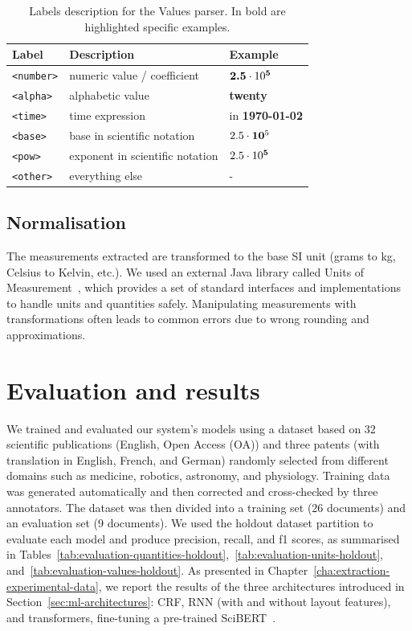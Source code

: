\begin{table}[htbp]
\centering
  \caption{Labels description for the Values parser. In bold are highlighted specific examples.}
  \label{tab:values-model-labels}
  \begin{tabular}{lll}
    \toprule
    Label & Description & Example\\
    \midrule
    \texttt{<number>} & numeric value / coefficient & $\textbf{2.5}\cdot10\textsuperscript{\textbf{5}}$ \\
    \texttt{<alpha>} & alphabetic value & \textbf{twenty} \\
    \texttt{<time>} & time expression  & in \textbf{1970-01-02}\\
    \texttt{<base>} & base in scientific notation & $2.5\cdot\textbf{10}\textsuperscript{5}$\\
    \texttt{<pow>} & exponent in scientific notation & $2.5\cdot10\textsuperscript{\textbf{5}}$ \\
    \texttt{<other>} & everything else & - \\
  \bottomrule
\end{tabular}
\end{table}

\subsection{Normalisation}

The measurements extracted are transformed to the base SI unit (grams to kg, Celsius to Kelvin, etc.). We used an external Java library called Units of Measurement~\cite{units_of_measurement}, which provides a set of standard interfaces and implementations to handle units and quantities safely. Manipulating measurements with transformations often leads to common errors due to wrong rounding and approximations. 

\section{Evaluation and results}
\label{sec:results}

We trained and evaluated our system's models using a dataset based on 32 scientific publications (English, Open Access (OA)) and three patents (with translation in English, French, and German) randomly selected from different domains such as medicine, robotics, astronomy, and physiology. 
Training data was generated automatically and then corrected and cross-checked by three annotators. The dataset was then divided into a training set (26 documents) and an evaluation set (9 documents).
We used the holdout dataset partition to evaluate each model and produce precision, recall, and f1 scores, as summarised in Tables~\ref{tab:evaluation-quantities-holdout},~\ref{tab:evaluation-units-holdout}, and~\ref{tab:evaluation-values-holdout}. 
As presented in Chapter~\ref{cha:extraction-experimental-data}, we report the results of the three architectures introduced in Section~\ref{sec:ml-architectures}: CRF, RNN (with and without layout features), and transformers, fine-tuning a pre-trained SciBERT~\cite{Beltagy2019SciBERT}. 

